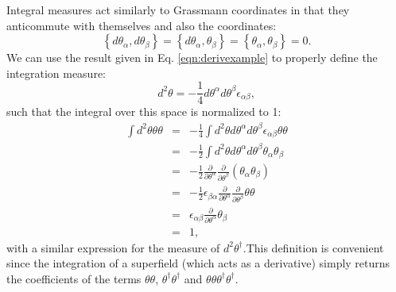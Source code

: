 Integral measures act similarly to Grassmann coordinates in that they anticommute with themselves and also the coordinates:
\begin{equation}
\left\{ d\theta_{\alpha},d\theta_{\beta}\right\} =\left\{ d\theta_{\alpha},\theta_{\beta}\right\} =\left\{ \theta_{\alpha},\theta_{\beta}\right\} =0.
\end{equation}
We can use the result given in Eq. \ref{eqn:derivexample} to properly define the integration measure:
\begin{equation}
d^{2}\theta=-\frac{1}{4}d\theta^{\alpha}d\theta^{\beta}\epsilon_{\alpha\beta},
\end{equation}
such that the integral over this space is normalized to 1:
\begin{eqnarray}
\int d^{2}\theta\theta\theta	&=&	-\frac{1}{4}\int d^{2}\theta d\theta^{\alpha}d\theta^{\beta}\epsilon_{\alpha\beta}\theta\theta \nonumber \\
	&=&	-\frac{1}{2}\int d^{2}\theta d\theta^{\alpha}d\theta^{\beta}\theta_{\alpha}\theta_{\beta} \nonumber \\
	&=&	-\frac{1}{2}\frac{\partial}{\partial\theta^{\alpha}}\frac{\partial}{\partial\theta^{\beta}}\left(\theta_{\alpha}\theta_{\beta}\right) \nonumber  \\
	&=&	-\frac{1}{2}\epsilon_{\beta\alpha}\frac{\partial}{\partial\theta^{\alpha}}\frac{\partial}{\partial\theta^{\beta}}\theta\theta \nonumber \\
	&=&	\epsilon_{\alpha\beta}\frac{\partial}{\partial\theta^{\alpha}}\theta_{\beta} \nonumber \\
	&=&	1,
\end{eqnarray}
with a similar expression for the measure of $d^{2} \theta^{\dagger}$.This definition is convenient since the integration of a superfield (which acts as a derivative) simply returns the coefficients of the terms $\theta \theta$, $\theta^{\dagger} \theta^{\dagger}$ and $\theta \theta \theta^{\dagger} \theta^{\dagger}$.

